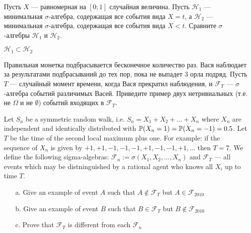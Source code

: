 \begin{problem}
Пусть $X$ --- равномерная на $ [0;1] $ случайная величина. Пусть $ \mathcal{H}_{1} $ --- минимальная $ \sigma $-алгебра, содержащая все события вида $ X=t $, а $ \mathcal{H}_{2} $ --- минимальная $ \sigma $-алгебра, содержащая все события вида $X<t$. Сравните $\sigma$-алгебры $ \mathcal{H}_{1} $ и $ \mathcal{H}_{2} $.
\end{problem} 
\begin{solution} 
$ \mathcal{H}_{1} \subset \mathcal{H}_{2} $
\end{solution}

\begin{problem}
Правильная монетка подбрасывается бесконечное количество раз. Вася наблюдает за результатами подбрасываний до тех пор, пока не выпадет 3 орла подряд. Пусть $ T $ --- случайный момент времени, когда Вася прекратил наблюдения, и $ \mathcal{F}_{T} $ --- $ \sigma $-алгебра событий различимых Васей. Приведите пример двух нетривиальных (т.е. не $ \Omega $ и не $ \emptyset $) событий входящих в $ \mathcal{F}_{T} $.
\end{problem} 
\begin{solution} 

\end{solution}

\begin{problem}
Let $ S_{n} $ be a symmetric random walk, i.e. $ S_{n}=X_{1}+X_{2}+\ldots+X_{n} $ where $ X_{n} $ are independent and identically distributed with $ \P(X_{n}=1)=\P(X_{n}=-1)=0.5 $. Let $T$ be the time of the second local maximum plus one. For example: if the sequence of $ X_{n} $ is given by $ +1,+1,-1,-1,-1,+1,-1,-1,+1,\ldots $ then $ T= 7$. We define the following sigma-algebras: $ \mathcal{F}_{n}:=\sigma(X_{1},X_{2},\ldots,X_{n})$ and $ \mathcal{F}_{T} $ --- all events which may be distninguished by a rational agent who knows all $ X_{i} $ up to time $ T $. 
\begin{itemize}
\item[a.] Give an example of event $A$ such that $ A\notin \mathcal{F}_{T} $ but $ A\in \mathcal{F}_{2010} $
\item[b.] Give an example of event $B$ such that $ B\in \mathcal{F}_{T} $ but $ B\notin \mathcal{F}_{2010} $
\item[c.] Prove that $ \mathcal{F}_{T} $ is different from each $ \mathcal{F}_{n} $
\end{itemize}

\end{problem} 
\begin{solution} 

\end{solution}

